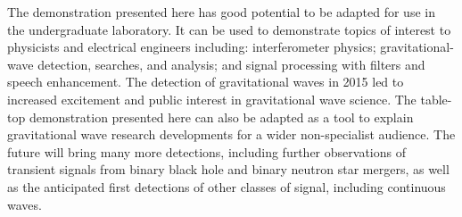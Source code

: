 \documentclass[paper-main.tex]{subfiles}
\begin{document}
The demonstration presented here has good potential to be adapted for use in the undergraduate laboratory. 
It can be used to demonstrate topics of interest to physicists and electrical engineers including: interferometer physics; gravitational-wave detection, searches, and analysis; and signal processing with filters and speech enhancement. 
The detection of gravitational waves in 2015 led to increased excitement and public interest in gravitational wave science. 
The table-top demonstration presented here can also be adapted as a tool to explain gravitational wave research developments for a wider non-specialist audience. 
The future will bring many more detections, including further observations of transient signals from binary black hole and binary neutron star mergers, as well as the anticipated first detections of other classes of signal, including continuous waves. 

\end{document}
